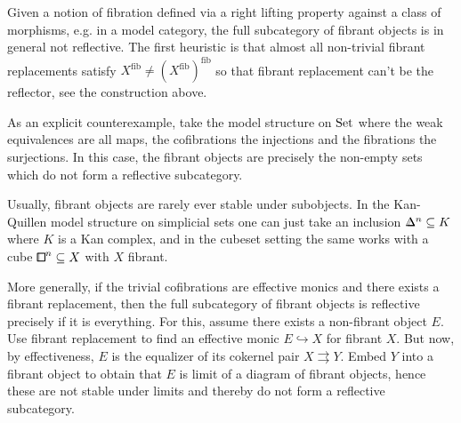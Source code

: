 \begin{remark}\label{rem:fibrant-non-reflective}
Given a notion of fibration defined via a right lifting property against a class of morphisms,
e.g. in a model category, the full subcategory of fibrant objects is in general not reflective.
The first heuristic is that almost all non-trivial fibrant replacements satisfy
$X^\mathrm{fib}\neq (X^\mathrm{fib})^\mathrm{fib}$ so that fibrant replacement can't be the reflector,
see the construction above.

As an explicit counterexample, take the model structure on $\mathrm{Set}$ where the weak equivalences are all maps, the cofibrations the injections and the fibrations the surjections.
In this case, the fibrant objects are precisely the non-empty sets which do not form a reflective subcategory.

Usually, fibrant objects are rarely ever stable under subobjects.
In the Kan-Quillen model structure on simplicial sets one can just take an inclusion $\bbDelta^n\sub K$ where $K$ is a Kan complex,
and in the cubeset setting the same works with a cube ${\bbox}^n\sub X$ with $X$ fibrant.

More generally, if the trivial cofibrations are effective monics and there exists a fibrant replacement,
then the full subcategory of fibrant objects is reflective precisely if it is everything.
For this, assume there exists a non-fibrant object $E$.
Use fibrant replacement to find an effective monic $E\hookrightarrow X$ for fibrant $X$.
But now, by effectiveness, $E$ is the equalizer of its cokernel pair $X\rightrightarrows Y$.
Embed $Y$ into a fibrant object to obtain that $E$ is limit of a diagram of fibrant objects, hence
these are not stable under limits and thereby do not form a reflective subcategory.
\end{remark}

